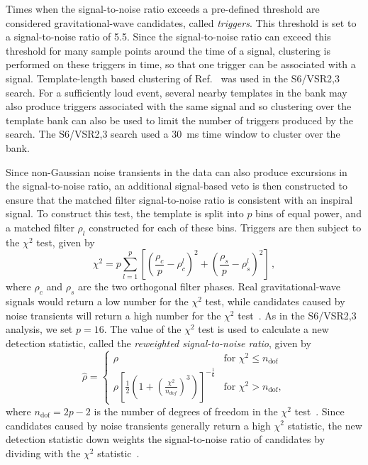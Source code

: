 Times when the signal-to-noise ratio exceeds a pre-defined threshold are
considered gravitational-wave candidates, called
\emph{triggers}\cite{Allen:2005fk}. This threshold is set to a
signal-to-noise ratio of 5.5.  Since the signal-to-noise ratio can exceed
this threshold for many sample points around the time of a signal, clustering
is performed on these triggers in time, so that one trigger can be associated
with a signal. Template-length based clustering of 
Ref.~\cite{Allen:2005fk} was used in the S6/VSR2,3 search. 
For a sufficiently loud event, several nearby templates in the
bank may also produce triggers associated with the same signal and so
clustering over the template bank can also be used to limit the number of
triggers produced by the search. The S6/VSR2,3 search used a 30~ms time window
to cluster over the bank.

Since non-Gaussian noise transients in the data can also produce excursions in
the signal-to-noise ratio, an additional signal-based veto is then constructed
to ensure that the matched filter signal-to-noise ratio is
consistent with an inspiral signal. To construct this test, the
template is split into $p$ bins of equal power, and a matched filter $\rho_l$
constructed for each of these bins. Triggers are then subject to the
$\chi^2$ test, given by
%
\begin{equation}
\chi^2 = p\displaystyle\sum_{l=1}^{p}\left[\left(\frac{\rho_c}{p}-\rho_c^l\right)^2 + \left(\frac{\rho_s}{p}-\rho_s^l\right)^2 \right] \, ,
\label{eq:chisqr}
\end{equation}
%
where $\rho_c$ and $\rho_s$ are the two orthogonal filter phases.
Real gravitational-wave signals would return a low number for the $\chi^2$
test, while candidates caused by noise transients will
return a high number for the $\chi^2$ test~\cite{Allen:2004gu}. As in the 
S6/VSR2,3 analysis, we set $p = 16$. The value of the $\chi^2$ test is used to 
calculate a new detection statistic, called the \emph{reweighted
signal-to-noise ratio}, given by 
%
\begin{equation}
\hat{\rho} =
  \begin{cases}
    \rho &\textrm{for } \chi^2 \leq n_\mathrm{dof}\\
    \rho[\frac{1}{2}(1+(\frac{\chi^2}{n_{dof}})^3)]^{-\frac{1}{6}} &\textrm{for } \chi^2 > n_\mathrm{dof} ,
  \end{cases}
\label{eq:newSNR}
\end{equation}
where $n_\mathrm{dof} = 2p-2$ is the number of degrees of freedom in the
$\chi^2$ test~\cite{Babak:2012zx}.
%
Since candidates caused by noise transients generally return a high $\chi^2$
statistic, the new detection statistic down weights the signal-to-noise ratio
of candidates by dividing with the $\chi^2$ statistic~\cite{Abadie:2011nz}.

